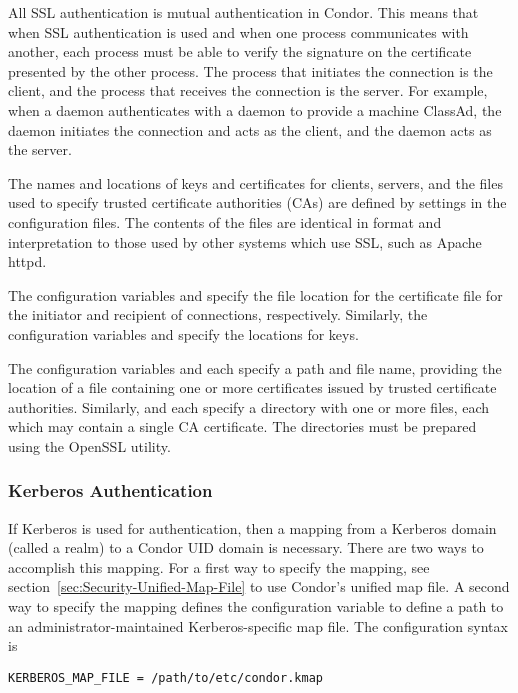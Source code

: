 All SSL authentication is mutual authentication in Condor.
This means that when SSL authentication is used and when one process
communicates with another, each process must be able to verify the
signature on the certificate presented by the other process.  
The process that initiates the connection is the client,
and the process that receives the connection is the server.
For example, when a  daemon
authenticates with a  daemon
to provide a machine ClassAd,
the  daemon initiates the connection and acts as the client,
and the  daemon acts as the server.

The names and locations of keys and certificates for clients,
servers, and the files used to specify trusted certificate authorities
(CAs) are defined by settings in the configuration files.
The contents of the files are identical in format
and interpretation to those used by
other systems which use SSL, such as Apache httpd.

The configuration variables 
 and 
specify the file location
for the certificate file for the initiator and recipient of connections,
respectively.
Similarly, the configuration variables
 and 
specify the locations for keys.

The configuration variables 
 and 
each specify a path and file name, providing the location
of a file containing one or more
certificates issued by trusted certificate authorities.
Similarly,
 and 
each specify a directory with one or more files,
each which may contain a single CA certificate.  The directories
must be prepared using the OpenSSL  utility.

\subsubsection{\label{sec:Kerberos-Authentication}Kerberos Authentication}

If Kerberos is used for authentication,
then a mapping from a
Kerberos domain (called a realm) to a Condor UID domain is necessary.
There are two ways to accomplish this mapping.
For a first way to specify the mapping, see
section~\ref{sec:Security-Unified-Map-File}
to use Condor's unified map file.
A second way to specify the mapping defines
the configuration variable
to define a path to an administrator-maintained Kerberos-specific 
map file.
The configuration syntax is
\begin{verbatim}
KERBEROS_MAP_FILE = /path/to/etc/condor.kmap
\end{verbatim}

